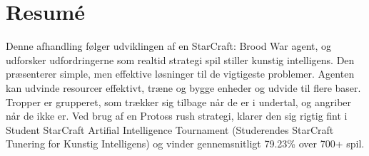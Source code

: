 \chapter{Resumé}
Denne afhandling følger udviklingen af en StarCraft: Brood War agent, og udforsker udfordringerne som realtid strategi spil stiller kunstig intelligens. Den præsenterer simple, men effektive løsninger til de vigtigeste problemer. Agenten kan udvinde resourcer effektivt, træne og bygge enheder og udvide til flere baser. Tropper er grupperet, som trækker sig tilbage når de er i undertal, og angriber når de ikke er. Ved brug af en Protoss rush strategi, klarer den sig rigtig fint i Student StarCraft Artifial Intelligence Tournament (Studerendes StarCraft Tunering for Kunstig Intelligens) og vinder gennemsnitligt 79.23\% over 700+ spil. 